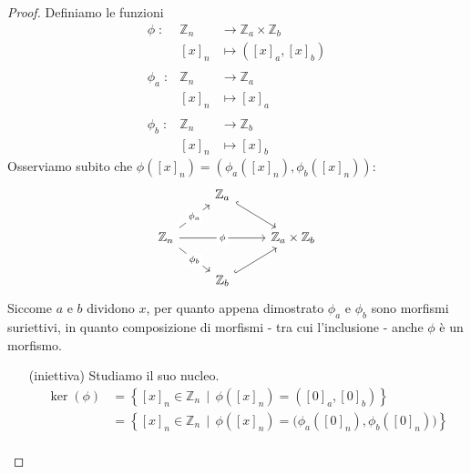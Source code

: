 \begin{proof}
	Definiamo le funzioni
	\begin{equation*}
		\begin{array}{rll}
			\phi \; \colon & \mathbb{Z}_n & \longrightarrow\mathbb{Z}_a \times \mathbb{Z}_b\\
			& [x]_n & \longmapsto\left([x]_a,[x]_b\right) \\
			 & & \\
			\phi_a \; \colon & \mathbb{Z}_n & \longrightarrow \mathbb{Z}_a \\
			& [x]_n & \longmapsto[x]_a\\
			 & & \\
			\phi_b \; \colon & \mathbb{Z}_n & \longrightarrow\mathbb{Z}_b \\
			& [x]_n & \longmapsto[x]_b
		\end{array}
	\end{equation*}
	Osserviamo subito che $\phi([x]_n)=\left(\phi_a([x]_n),\phi_b([x]_n)\right)$:
	\begin{equation*}
	\begin{tikzcd}
	& \mathbb{Z}_a \arrow[rd, hook] &                                \\
	\mathbb{Z}_n \arrow[ru, "\phi_a" description] \arrow[rd, "\phi_b" description] \arrow[rr, "\phi" description] &                               & \mathbb{Z}_a\times\mathbb{Z}_b \\
	& \mathbb{Z}_b \arrow[ru, hook] &                               
	\end{tikzcd}
	\end{equation*}
	Siccome $a$ e $b$ dividono $x$, per quanto appena dimostrato $\phi_a$ e $\phi_b$ sono morfismi suriettivi, in quanto composizione di morfismi - tra cui l'inclusione - anche $\phi$ è un morfismo.
	\begin{itemize}
		\item[(iniettiva)] Studiamo il suo nucleo.
		\begin{align*}
		\ker(\phi)&=\left\{[x]_n\in\mathbb{Z}_n \, \mid \, \phi([x]_n)=\left([0]_a,[0]_b\right)\right\}\\
		&=\left\{[x]_n\in\mathbb{Z}_n \, \mid \, \phi([x]_n)=\big(\phi_a([0]_n),\phi_b([0]_n)\big)\right\}\\

\end{align*}
\end{itemize}
\end{proof}
